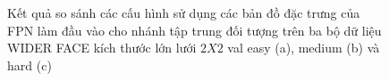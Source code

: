 {    \begin{figure}[H]
        \centering
        \caption{Kết quả so sánh các cấu hình sử dụng các bản đồ đặc trưng của FPN làm đầu vào cho nhánh tập trung đối tượng trên ba bộ dữ liệu WIDER FACE kích thước lớn lưới $2 X 2$ val easy (a), medium (b) và hard (c)}
        \label{fig:retinafocus_widerface_2k_val_fpn}
    \end{figure}

}
